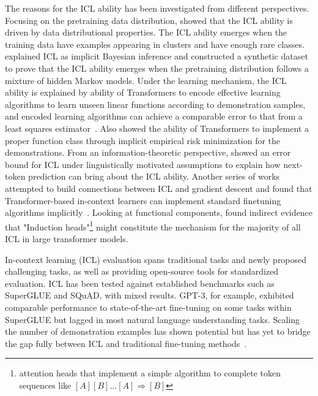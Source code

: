 The reasons for the ICL ability has been investigated from different perspectives.
Focusing on the pretraining data distribution, \textcite{chan2022data} showed that the ICL ability is driven by data distributional properties.
The ICL ability emerges when the training data have examples appearing in clusters and have enough rare classes.
\textcite{xie2022an} explained ICL as implicit Bayesian inference and constructed a synthetic dataset to prove that the ICL ability emerges when the pretraining distribution follows a mixture of hidden Markov models.
Under the learning mechanism, the ICL ability is explained by ability of Transformers to encode effective learning algorithms to learn unseen linear functions according to demonstration samples, and encoded learning algorithms can achieve a comparable error to that from a least squares estimator~\cite{garg2023transformers}.
Also \textcite{li2023transformers} showed the ability of Transformers to implement a proper function class through implicit empirical risk minimization for the demonstrations.
From an information-theoretic perspective, \textcite{hahn2023theory} showed an error bound for ICL under linguistically motivated assumptions to explain how next-token prediction can bring about the ICL ability.
Another series of works attempted to build connections between ICL and gradient descent and found that Transformer-based in-context learners can implement standard finetuning algorithms implicitly~\cite{akyurek2022what, vonoswald2023transformers, li2023transformers}.
Looking at functional components, \textcite{olsson2022incontext} found indirect evidence that "Induction heads"\footnote{attention heads that implement a simple algorithm to complete token sequences like $[A][B] \dots [A] \Rightarrow [B]$} might constitute the mechanism for the majority of all ICL in large transformer models.

In-context learning (ICL) evaluation spans traditional tasks and newly proposed challenging tasks, as well as providing open-source tools for standardized evaluation.
ICL has been tested against established benchmarks such as SuperGLUE and SQuAD, with mixed results.
GPT-3, for example, exhibited comparable performance to state-of-the-art fine-tuning on some tasks within SuperGLUE but lagged in most natural language understanding tasks.
Scaling the number of demonstration examples has shown potential but has yet to bridge the gap fully between ICL and traditional fine-tuning methods~\cite{brown2020language, hao2022structured}.

